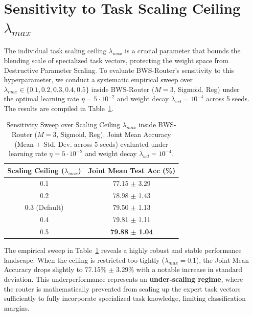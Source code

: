 \section{Sensitivity to Task Scaling Ceiling $\lambda_{max}$}
\label{app:lambda_sweep}
The individual task scaling ceiling $\lambda_{max}$ is a crucial parameter that bounds the blending scale of specialized task vectors, protecting the weight space from Destructive Parameter Scaling. To evaluate BWS-Router's sensitivity to this hyperparameter, we conduct a systematic empirical sweep over $\lambda_{max} \in \{0.1, 0.2, 0.3, 0.4, 0.5\}$ inside BWS-Router ($M=3$, Sigmoid, Reg) under the optimal learning rate $\eta = 5 \cdot 10^{-2}$ and weight decay $\lambda_{wd} = 10^{-4}$ across 5 seeds. The results are compiled in Table~\ref{tab:lambda_max_sweep}.

\begin{table}[h]
\caption{Sensitivity Sweep over Scaling Ceiling $\lambda_{max}$ inside BWS-Router ($M=3$, Sigmoid, Reg). Joint Mean Accuracy (Mean $\pm$ Std. Dev. across 5 seeds) evaluated under learning rate $\eta = 5 \cdot 10^{-2}$ and weight decay $\lambda_{wd} = 10^{-4}$.}
\label{tab:lambda_max_sweep}
\vskip 0.15in
\begin{center}
\begin{small}
\begin{tabular}{cc}
\toprule
\textbf{Scaling Ceiling ($\lambda_{max}$)} & \textbf{Joint Mean Test Acc (\%)} \\
\midrule
0.1 & 77.15 $\pm$ 3.29 \\
0.2 & 78.98 $\pm$ 1.43 \\
0.3 (Default) & 79.50 $\pm$ 1.13 \\
0.4 & 79.81 $\pm$ 1.11 \\
0.5 & \textbf{79.88 $\pm$ 1.04} \\
\bottomrule
\end{tabular}
\end{small}
\end{center}
\vskip -0.1in
\end{table}

The empirical sweep in Table~\ref{tab:lambda_max_sweep} reveals a highly robust and stable performance landscape. When the ceiling is restricted too tightly ($\lambda_{max} = 0.1$), the Joint Mean Accuracy drops slightly to 77.15\% $\pm$ 3.29\% with a notable increase in standard deviation. This underperformance represents an \textbf{under-scaling regime}, where the router is mathematically prevented from scaling up the expert task vectors sufficiently to fully incorporate specialized task knowledge, limiting classification margins.

